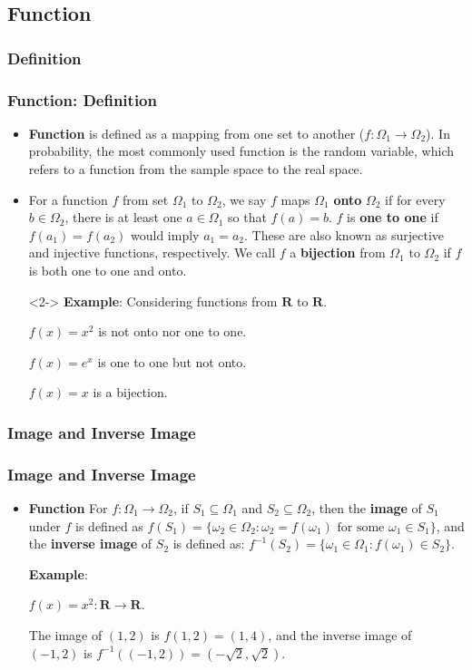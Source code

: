 \documentclass[handout]{beamer}
\begin{document}
\subsection{Function}
\subsubsection{Definition}

\frame
{
  \frametitle{Function: Definition}

\begin{itemize}
\item<1-> \textbf{Function} is defined as a mapping from one set to another ($f: \Omega_1\rightarrow \Omega_2$). In probability, the most commonly used function is the random variable, which refers to a function from the sample space to the real space.

\item<1-> For a function $f$ from set $\Omega_1$ to $\Omega_2$, we say $f$ maps $\Omega_1$ \textbf{onto} $\Omega_2$ if for every $b \in \Omega_2$, there is at least one $a\in \Omega_1$ so that $f(a)=b$. $f$ is \textbf{one to one} if $f(a_1)=f(a_2)$ would imply $a_1=a_2.$ These are also known as surjective and injective functions, respectively. We call $f$ a \textbf{bijection} from $\Omega_1$ to $\Omega_2$ if $f$ is both one to one and onto. 

\item [] <2-> \textbf{Example}: Considering  functions from $\mathbf{R}$ to $\mathbf{R}$.

 $f(x)=x^2$ is not onto nor one to one.  
 
 $f(x)=e^x$ is one to one but not onto. 
 
 $f(x)=x$ is a bijection. 

\end{itemize}

}


\subsubsection{Image and Inverse Image}
\frame
{
  \frametitle{Image and Inverse Image}

\begin{itemize}
\item<1-> \textbf{Function}  For $f: \Omega_1\rightarrow \Omega_2$, if $S_1\subseteq \Omega_1$ and $S_2\subseteq \Omega_2$, then the \textbf{image} of $S_1$ under $f$ is defined as $f(S_1)=\{\omega_2\in \Omega_2: \omega_2=f(\omega_1) \text{ for some } \omega_1\in S_1\}$, and the \textbf{inverse image} of $S_2$ is defined as: $f^{-1}(S_2)=\{\omega_1\in \Omega_1: f(\omega_1) \in S_2 \}$.
\newline


\textbf{Example}:  

$f(x)=x^2: \mathbf{R}\rightarrow \mathbf{R}$. 

The image of $(1,2)$ is $f(1,2)=(1,4)$, and the inverse image of $(-1,2)$ is $f^{-1}((-1,2))=(-\sqrt{2},\sqrt{2})$.


\end{itemize}

}
\end{document}
